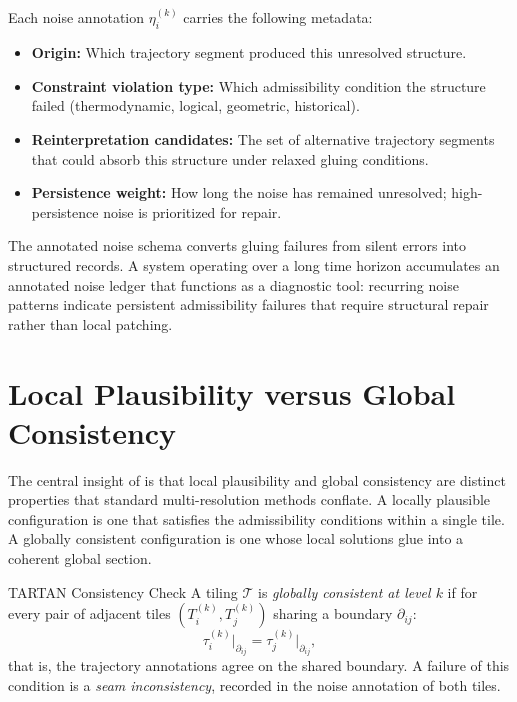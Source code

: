 Each noise annotation $\eta_i^{(k)}$ carries the following metadata:

\begin{itemize}
  \item \textbf{Origin:} Which trajectory segment produced this unresolved
    structure.
  \item \textbf{Constraint violation type:} Which admissibility condition the
    structure failed (thermodynamic, logical, geometric, historical).
  \item \textbf{Reinterpretation candidates:} The set of alternative
    trajectory segments that could absorb this structure under relaxed
    gluing conditions.
  \item \textbf{Persistence weight:} How long the noise has remained unresolved;
    high-persistence noise is prioritized for repair.
\end{itemize}

The annotated noise schema converts gluing failures from silent errors into
structured records. A \TARTAN system operating over a long time horizon
accumulates an annotated noise ledger that functions as a diagnostic tool:
recurring noise patterns indicate persistent admissibility failures that
require structural repair rather than local patching.

\section{Local Plausibility versus Global Consistency}

\claimH The central insight of \TARTAN is that local plausibility and global
consistency are distinct properties that standard multi-resolution methods
conflate. A locally plausible configuration is one that satisfies the
admissibility conditions within a single tile. A globally consistent configuration
is one whose local solutions glue into a coherent global section.

\begin{definition}{TARTAN Consistency Check}
A tiling $\mathcal{T}$ is \emph{globally consistent at level $k$} if for every
pair of adjacent tiles $(T_i^{(k)}, T_j^{(k)})$ sharing a boundary $\partial_{ij}$:
\[
  \tau_i^{(k)}\big|_{\partial_{ij}} = \tau_j^{(k)}\big|_{\partial_{ij}},
\]
that is, the trajectory annotations agree on the shared boundary. A failure of
this condition is a \emph{seam inconsistency}, recorded in the noise annotation
of both tiles.
\end{definition}

